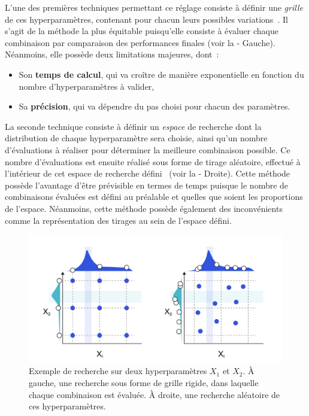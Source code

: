 L’une des premières techniques permettant ce réglage consiste à définir une \textit{grille} de ces hyperparamètres, contenant pour chacun leurs possibles variations~\cite{Liu2006}. Il s'agit de la méthode la plus équitable puisqu'elle consiste à évaluer chaque combinaison par comparaison des performances finales (voir la  - Gauche). Néanmoins, elle possède deux limitations majeures, dont~:
\begin{itemize}
    \item Son \textbf{temps de calcul}, qui va croître de manière exponentielle en fonction du nombre d'hyperparamètres à valider,
    \item Sa \textbf{précision}, qui va dépendre du pas choisi pour chacun des paramètres.
\end{itemize}\par

La seconde technique consiste à définir un \textit{espace} de recherche dont la distribution de chaque hyperparamètre sera choisie, ainsi qu'un nombre d'évaluations à réaliser pour déterminer la meilleure combinaison possible. Ce nombre d'évaluations est ensuite réalisé sous forme de tirage aléatoire, effectué à l'intérieur de cet espace de recherche défini~\cite{bergstra2012} (voir la  - Droite). Cette méthode possède l'avantage d'être prévisible en termes de temps puisque le nombre de combinaisons évaluées est défini au préalable et quelles que soient les proportions de l'espace. Néanmoins, cette méthode possède également des inconvénients comme la représentation des tirages au sein de l'espace défini.

\begin{figure}[H]
    \centering
    \includegraphics[width=\linewidth]{contents/chapter_3/resources/example_hyperparameter_selection.pdf}
    \caption{Exemple de recherche sur deux hyperparamètres $X_1$ et $X_2$. À gauche, une recherche sous forme de grille rigide, dans laquelle chaque combinaison est évaluée. À droite, une recherche aléatoire de ces hyperparamètres.}
    \label{fig:example_hyperparameter_selection}
\end{figure}

